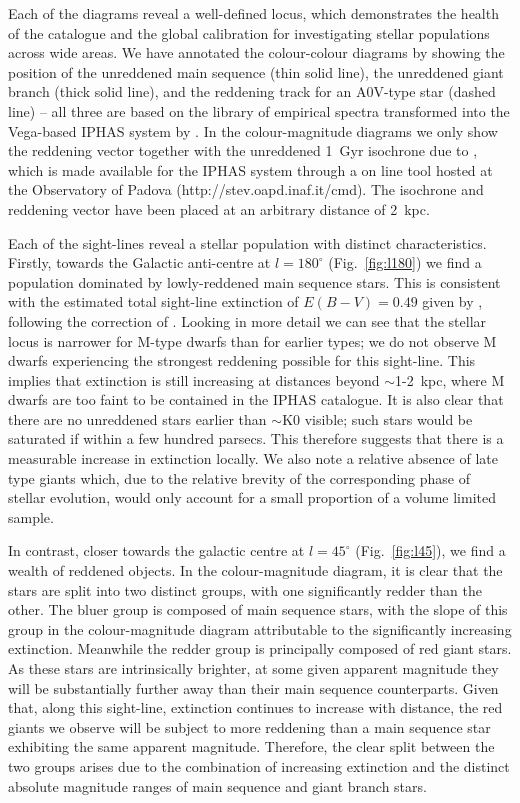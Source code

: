 \documentclass[useAMS,usenatbib]{mn2e}
\begin{document}
Each of the diagrams reveal a well-defined locus,
which demonstrates the health of the catalogue and the global calibration
for investigating stellar populations across wide areas.
We have annotated the colour-colour diagrams
by showing the position 
of the unreddened main sequence (thin solid line),
the unreddened giant branch (thick solid line),
and the reddening track for an A0V-type star (dashed line)
-- all three are based on the \cite{Pickles1998} library 
of empirical spectra
transformed into the Vega-based IPHAS system by \cite{Drew2005}.
In the colour-magnitude diagrams we only show the reddening vector
together with the unreddened 1~Gyr isochrone due to \cite{Bressan2012},
which is made available for the IPHAS system through a
on line tool hosted at the Observatory of Padova
(http://stev.oapd.inaf.it/cmd).
The isochrone and reddening vector have been placed
at an arbitrary distance of 2~kpc.

Each of the sight-lines reveal a stellar population
with distinct characteristics.
Firstly, towards the Galactic anti-centre 
at $l=180^\circ$ (Fig.~\ref{fig:l180})
we find a population dominated by lowly-reddened main sequence stars.
This is consistent with the estimated total sight-line extinction 
of $E(B-V)=0.49$ given by \cite{Schlegel1998},
following the correction of \cite{Schlafly2011}.
Looking in more detail we can see
that the stellar locus is narrower for M-type dwarfs
than for earlier types;
we do not observe M dwarfs experiencing 
the strongest reddening possible for this sight-line.
This implies that extinction is still increasing 
at distances beyond $\sim$1-2~kpc,
where M dwarfs are too faint to be contained in the IPHAS catalogue.
It is also clear that there are no unreddened stars
earlier than $\sim$K0 visible;
such stars would be saturated if within a few hundred parsecs.
This therefore suggests 
that there is a measurable increase in extinction locally.
We also note a relative absence of late type giants which,
due to the relative brevity 
of the corresponding phase of stellar evolution,
would only account for a small proportion of a volume limited sample.
 
In contrast, 
closer towards the galactic centre
at $l=45^{\circ}$ (Fig.~\ref{fig:l45}),
we find a wealth of reddened objects.
In the colour-magnitude diagram, it is clear
that the stars are split into two distinct groups,
with one significantly redder than the other.
The bluer group is composed of main sequence stars,
with the slope of this group in the colour-magnitude diagram
attributable to the significantly increasing extinction.
Meanwhile the redder group is principally composed of red giant stars.
As these stars are intrinsically brighter,
at some given apparent magnitude they will be substantially further away
than their main sequence counterparts.
Given that, along this sight-line,
extinction continues to increase with distance,
the red giants we observe will be subject to more reddening
than a main sequence star exhibiting the same apparent magnitude.
Therefore, the clear split between the two groups arises
due to the combination of increasing extinction
and the distinct absolute magnitude ranges
of main sequence and giant branch stars.
\end{document}
